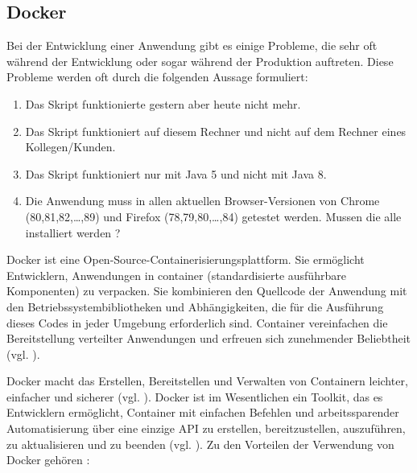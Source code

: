 \subsection{Docker}

Bei der Entwicklung einer Anwendung gibt es einige Probleme, die
sehr oft während der Entwicklung oder sogar während der Produktion
auftreten. Diese Probleme werden oft durch die folgenden Aussage
formuliert:

\begin{enumerate}
    \item Das Skript funktionierte gestern aber heute nicht mehr.
    \item Das Skript funktioniert auf diesem Rechner und nicht auf
    dem Rechner eines Kollegen/Kunden.
    \item Das Skript funktioniert nur mit Java 5 und nicht mit Java 8.
    \item Die Anwendung muss in allen aktuellen Browser-Versionen von Chrome (80,81,82,\ldots,89) und Firefox (78,79,80,\ldots,84) getestet werden.
    Mussen die alle installiert werden ?
\end{enumerate}

Docker ist eine Open-Source-Containerisierungsplattform. Sie
ermöglicht Entwicklern, Anwendungen in \gls{container}
(standardisierte ausführbare Komponenten) zu verpacken.
Sie kombinieren den Quellcode der Anwendung mit den
Betriebssystembibliotheken und Abhängigkeiten, die für die
Ausführung dieses Codes in jeder Umgebung erforderlich sind.
Container vereinfachen die Bereitstellung verteilter Anwendungen und
erfreuen sich zunehmender Beliebtheit (vgl. \cite{docker}).

Docker macht das Erstellen, Bereitstellen und Verwalten von
Containern leichter, einfacher und sicherer (vgl. \cite{ibm-docker}).
Docker ist im Wesentlichen ein Toolkit, das es Entwicklern ermöglicht,
Container mit einfachen Befehlen und arbeitssparender Automatisierung
über eine einzige API zu erstellen, bereitzustellen, auszuführen,
zu aktualisieren und zu beenden (vgl. \cite{ibm-docker}). Zu den Vorteilen der Verwendung von
Docker gehören :

